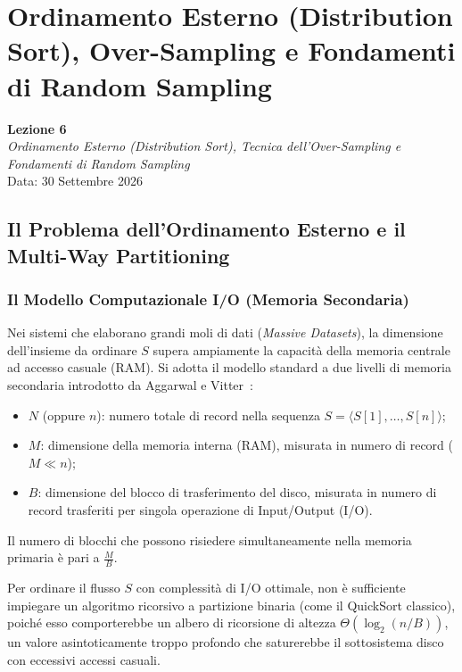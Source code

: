 \chapter{Ordinamento Esterno (Distribution Sort), Over-Sampling e Fondamenti di Random Sampling}
\label{chap:external-distribution-sort}

\begin{center}
  \textbf{Lezione 6}\\
  \emph{Ordinamento Esterno (Distribution Sort), Tecnica dell'Over-Sampling e Fondamenti di Random Sampling}\\[0.5em]
  Data: 30 Settembre 2026
\end{center}

\section{Il Problema dell'Ordinamento Esterno e il Multi-Way Partitioning}
\label{sec:external-sorting-multiway}

\subsection{Il Modello Computazionale I/O (Memoria Secondaria)}
Nei sistemi che elaborano grandi moli di dati (\textit{Massive Datasets}), la dimensione dell'insieme da ordinare $S$ supera ampiamente la capacità della memoria centrale ad accesso casuale (RAM). Si adotta il modello standard a due livelli di memoria secondaria introdotto da Aggarwal e Vitter~\cite{aggarwal1988}:
\begin{itemize}
  \item $N$ (oppure $n$): numero totale di record nella sequenza $S = \langle S[1], \dots, S[n] \rangle$;
  \item $M$: dimensione della memoria interna (RAM), misurata in numero di record ($M \ll n$);
  \item $B$: dimensione del blocco di trasferimento del disco, misurata in numero di record trasferiti per singola operazione di Input/Output (I/O).
\end{itemize}

Il numero di blocchi che possono risiedere simultaneamente nella memoria primaria è pari a $\frac{M}{B}$.

Per ordinare il flusso $S$ con complessità di I/O ottimale, non è sufficiente impiegare un algoritmo ricorsivo a partizione binaria (come il QuickSort classico), poiché esso comporterebbe un albero di ricorsione di altezza $\Theta(\log_2(n/B))$, un valore asintoticamente troppo profondo che saturerebbe il sottosistema disco con eccessivi accessi casuali. 

